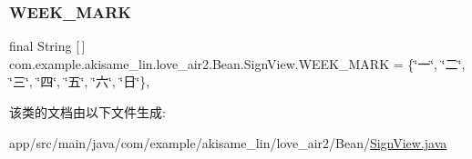\subsubsection{\texorpdfstring{WEEK\_MARK}{WEEK\_MARK}}
{\footnotesize\ttfamily final String \mbox{[}$\,$\mbox{]} com.\+example.\+akisame\+\_\+lin.\+love\+\_\+air2.\+Bean.\+Sign\+View.\+W\+E\+E\+K\+\_\+\+M\+A\+RK = \{\char`\"{}一\char`\"{}, \char`\"{}二\char`\"{}, \char`\"{}三\char`\"{}, \char`\"{}四\char`\"{}, \char`\"{}五\char`\"{}, \char`\"{}六\char`\"{}, \char`\"{}日\char`\"{}\}\hspace{0.3cm}{\ttfamily [static]}, {\ttfamily [private]}}



该类的文档由以下文件生成\+:\begin{DoxyCompactItemize}
\item 
app/src/main/java/com/example/akisame\+\_\+lin/love\+\_\+air2/\+Bean/\mbox{\hyperlink{_sign_view_8java}{Sign\+View.\+java}}\end{DoxyCompactItemize}
